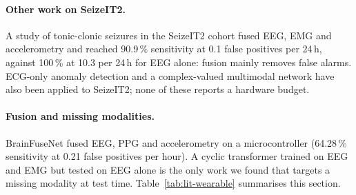 \paragraph{Other work on SeizeIT2.} A study of tonic-clonic seizures in the SeizeIT2 cohort \cite{zhang2024tcs} fused
EEG, EMG and accelerometry and reached 90.9\,\% sensitivity at 0.1 false positives per 24\,h, against 100\,\% at 10.3
per 24\,h for EEG alone: fusion mainly removes false alarms. ECG-only anomaly detection \cite{reintjes2025ecg} and a
complex-valued multimodal network \cite{su2026cmepinet} have also been applied to SeizeIT2; none of these reports a
hardware budget.

\paragraph{Fusion and missing modalities.} BrainFuseNet \cite{ingolfsson2024brainfusenet} fused EEG, PPG and
accelerometry on a microcontroller (64.28\,\% sensitivity at 0.21 false positives per hour). A cyclic transformer
trained on EEG and EMG but tested on EEG alone \cite{zhang2024cyclic} is the only work we found that targets a missing
modality at test time. Table~\ref{tab:lit-wearable} summarises this section.

